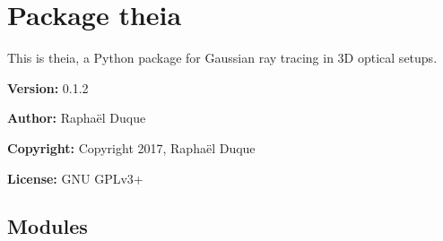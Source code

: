 %
%
%


\section{Package theia}

    \label{theia}
This is theia, a Python package for Gaussian ray tracing in 3D optical 
setups.

\textbf{Version:} 0.1.2



\textbf{Author:} Raphaël Duque



\textbf{Copyright:} Copyright 2017, Raphaël Duque



\textbf{License:} GNU GPLv3+





\subsection{Modules}

